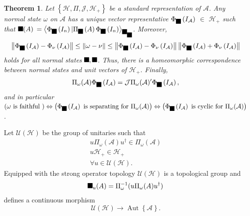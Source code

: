 \documentclass[aps,preprint]{revtex4}%
\providecommand{\U}[1]{\protect\rule{.1in}{.1in}}
\newtheorem{theorem}{Theorem}
\begin{document}
\begin{theorem}
Let $\left\{  \mathcal{H},\Pi,\mathcal{J},\mathcal{H}_{+}\right\}  $ be a
standard representation of $\mathcal{A}$. Any normal state $\omega$ on
$\mathcal{A}$ has a unique vector representative $\Phi_{\U{3c9} }\left(
I_{\mathcal{A}}\right)  $ $\in$ $\mathcal{H}_{+}$ such that $\U{3c9} (A)$
$=\left\langle \Phi_{\U{3c9} }\left(  I_{n}\right)  |\Pi_{\U{3c9} }\left(
A\right)  \Phi_{\U{3c9} }\left(  I_{n}\right)  \right\rangle _{\U{3c9}
_{\U{3c1} }}$. Moreover,%
\begin{equation}
\left\Vert \Phi_{\U{3c9} }\left(  I_{\mathcal{A}}\right)  -\Phi_{\nu}\left(
I_{\mathcal{A}}\right)  \right\Vert \leq\left\Vert \omega-\nu\right\Vert
\leq\left\Vert \Phi_{\U{3c9} }\left(  I_{\mathcal{A}}\right)  -\Phi_{\nu
}\left(  I_{\mathcal{A}}\right)  \right\Vert \left\Vert \Phi_{\U{3c9} }\left(
I_{\mathcal{A}}\right)  +\Phi_{\nu}\left(  I_{\mathcal{A}}\right)
\right\Vert
\end{equation}
holds for all normal states $\U{3c9} ,\U{3bd} $. Thus, there is a
\emph{homeomorphic correspondence} between \emph{normal states and unit
vectors} of $\mathcal{H}_{+}$. Finally,%
\begin{equation}
\Pi_{\omega}(\mathcal{A})\Phi_{\U{3c9} }\left(  I_{\mathcal{A}}\right)
=\mathcal{J}\Pi_{\omega}(\mathcal{A})^{\prime}\Phi_{\U{3c9} }\left(
I_{\mathcal{A}}\right)  ,
\end{equation}
and in particular $\left(  \omega\text{ is faithful }\right)  \Leftrightarrow
\left(  \Phi_{\U{3c9} }\left(  I_{\mathcal{A}}\right)  \text{ is separating
for }\Pi_{\omega}(\mathcal{A})\right)  \Leftrightarrow\left(  \Phi_{\U{3c9}
}\left(  I_{\mathcal{A}}\right)  \text{ is cyclic for }\Pi_{\omega
}(\mathcal{A})\right)  $.
\end{theorem}

Let $\mathcal{U}\left(  \mathcal{H}\right)  $ be the group of unitaries such
that
\begin{gather}
u\Pi_{\omega}(\mathcal{A})u^{\dagger}\in\Pi_{\omega}(\mathcal{A})\\
u\mathcal{H}_{+}\in\mathcal{H}_{+}\\
\forall u\in\mathcal{U}\left(  \mathcal{H}\right)  .
\end{gather}
Equipped with the strong operator topology $\mathcal{U}\left(  \mathcal{H}%
\right)  $ is a topological group and
\begin{equation}
\U{3c4} _{u}(A)=\Pi_{\omega}^{-1}(u\Pi_{\omega}(A)u^{\dagger})
\end{equation}
defines a continuous morphism%
\begin{equation}
\mathcal{U}\left(  \mathcal{H}\right)  \rightarrow\operatorname{Aut}\left\{
\mathcal{A}\right\}  .
\end{equation}
\end{document}
